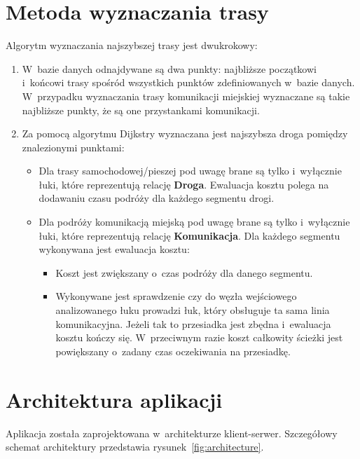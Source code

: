 \documentclass[a4paper,12pt]{article}
\begin{document}
	\section*{Metoda wyznaczania trasy}

	Algorytm wyznaczania najszybszej trasy jest dwukrokowy:

	\begin{enumerate}
		\item W~bazie danych odnajdywane są dwa punkty: najbliższe początkowi i~końcowi trasy spośród wszystkich punktów zdefiniowanych w~bazie danych. W~przypadku wyznaczania trasy komunikacji miejskiej wyznaczane są takie najbliższe punkty, że są one przystankami komunikacji.
		\item Za pomocą algorytmu Dijkstry wyznaczana jest najszybsza droga pomiędzy znalezionymi punktami:
			\begin{itemize}
				\item Dla trasy samochodowej/pieszej pod uwagę brane są tylko i~wyłącznie łuki, które reprezentują relację \textbf{Droga}. Ewaluacja kosztu polega na dodawaniu czasu podróży dla każdego segmentu drogi.
				\item Dla podróży komunikacją miejską pod uwagę brane są tylko i~wyłącznie łuki, które reprezentują relację \textbf{Komunikacja}. Dla każdego segmentu wykonywana jest ewaluacja kosztu:
					\begin{itemize}
						\item Koszt jest zwiększany o~czas podróży dla danego segmentu.
						\item Wykonywane jest sprawdzenie czy do węzła wejściowego analizowanego łuku prowadzi łuk, który obsługuje ta sama linia komunikacyjna. Jeżeli tak to przesiadka jest zbędna i~ewaluacja kosztu kończy się. W~przeciwnym razie koszt całkowity ścieżki jest powiększany o~zadany czas oczekiwania na przesiadkę.
					\end{itemize}
			\end{itemize}
	\end{enumerate}

	\section*{Architektura aplikacji}

	Aplikacja została zaprojektowana w~architekturze klient-serwer. Szczegółowy schemat architektury przedstawia rysunek~\ref{fig:architecture}. 
\end{document}
